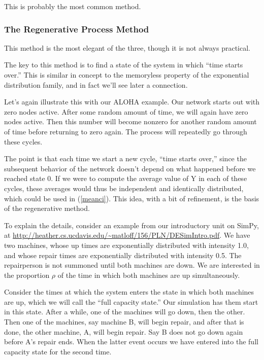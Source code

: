 This is probably the most common method.

\subsubsection{The Regenerative Process Method}

This method is the most elegant of the three, though it is not always
practical.

The key to this method is to find a state of the system in which ``time
starts over.''  This is similar in concept to the memoryless property of
the exponential distribution family, and in fact we'll see later a
connection.

Let's again illustrate this with our ALOHA example.  Our network starts
out with zero nodes active.  After some random amount of time, we will
again have zero nodes active.  Then this number will become nonzero for
another random amount of time before returning to zero again.  The
process will repeatedly go through these cycles.  

The point is that each time we start a new cycle, ``time starts over,''
since the subsequent behavior of the network doesn't depend on what
happened before we reached state 0.  If we were to compute the average
value of Y in each of these cycles, these averages would thus be
independent and identically distributed, which could be used in
(\ref{meanci}).  This idea, with a bit of refinement, is the basis of
the regenerative method.

To explain the details, consider an example from our introductory unit
on SimPy, at
\url{http://heather.cs.ucdavis.edu/~matloff/156/PLN/DESimIntro.pdf}.  We
have two machines, whose up times are exponentially distributed with
intensity 1.0, and whose repair times are exponentially distributed with
intensity 0.5.  The repairperson is not summoned until both machines are
down.  We are interested in the proportion $\rho$ of the time in which
both machines are up simultaneously.

Consider the times at which the system enters the state in which both
machines are up, which we will call the ``full capacity state.''  Our
simulation has them start in this state.  After a while, one of the
machines will go down, then the other.  Then one of the machines, say
machine B, will begin repair, and after that is done, the other machine,
A, will begin repair.  Say B does not go down again before A's repair
ends.  When the latter event occurs we have entered into the full
capacity state for the second time.

